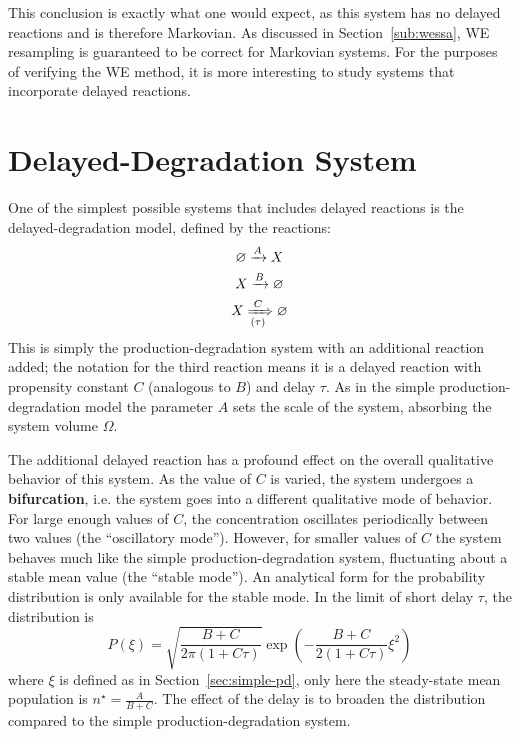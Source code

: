 \documentclass[english,letterpaper,12pt]{report}
\newcommand{\defkeywd}[1]{\textbf{#1}}
\begin{document}
\begin{doublespacing}
This conclusion is exactly what one would expect, as this system has no delayed reactions and is therefore Markovian. As discussed in Section~\ref{sub:wessa}, WE resampling is guaranteed to be correct for Markovian systems. For the purposes of verifying the WE method, it is more interesting to study systems that incorporate delayed reactions.



\section{Delayed-Degradation System} %
\label{sec:delayed-deg}

One of the simplest possible systems that includes delayed reactions is the delayed-degradation model, defined by the reactions:
\begin{align}
    \begin{gathered}
        \varnothing \xrightarrow{A} X \\
        X \xrightarrow {B} \varnothing \\
        X \xRightarrow[(\tau)]{C} \varnothing
    \end{gathered}
    \label{eq:delayed-deg-rxns}
\end{align}
This is simply the production-degradation system with an additional reaction added; the notation for the third reaction means it is a delayed reaction with propensity constant $C$ (analogous to $B$) and delay $\tau$. As in the simple production-degradation model the parameter $A$ sets the scale of the system, absorbing the system volume $\Omega$.

The additional delayed reaction has a profound effect on the overall qualitative behavior of this system. As the value of $C$ is varied, the system undergoes a \defkeywd{bifurcation}, i.e. the system goes into a different qualitative mode of behavior. For large enough values of $C$, the concentration oscillates periodically between two values (the ``oscillatory mode''). However, for smaller values of $C$ the system behaves much like the simple production-degradation system, fluctuating about a stable mean value (the ``stable mode''). An analytical form for the probability distribution is only available for the stable mode. In the limit of short delay $\tau$, the distribution is \cite{delayed-deg-notes}
\begin{equation}
    P(\xi) = \sqrt{\frac{B + C}{2\pi(1 + C\tau)}}\exp\left( -\frac{B + C}{2(1 + C\tau)} \xi^2 \right)
    \label{eq:dd-analytic-dist}
\end{equation}
where $\xi$ is defined as in Section~\ref{sec:simple-pd}, only here the steady-state mean population is $n^\star = \frac{A}{B + C}$. The effect of the delay is to broaden the distribution compared to the simple production-degradation system.


\end{doublespacing}
\end{document}
